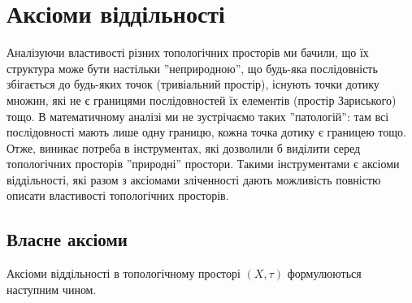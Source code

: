 \chapter{Аксіоми віддільності}

Аналізуючи властивості різних топологічних просторів
ми бачили, що їх структура може бути настільки
''неприродною'', що будь-яка послідовність збігається до
будь-яких точок (тривіальний простір), існують точки
дотику множин, які не є границями послідовностей їх
елементів (простір Зариського) тощо. В математичному
аналізі ми не зустрічаємо таких ''патологій'': там всі
послідовності мають лише одну границю, кожна точка
дотику є границею тощо. Отже, виникає потреба в
інструментах, які дозволили б виділити серед
топологічних просторів ''природні'' простори. Такими
інструментами є аксіоми віддільності, які разом з аксіомами
зліченності дають можливість повністю описати
властивості топологічних просторів.

\section{Власне аксіоми}

Аксіоми віддільності в топологічному просторі $(X, \tau)$
формулюються наступним чином.

